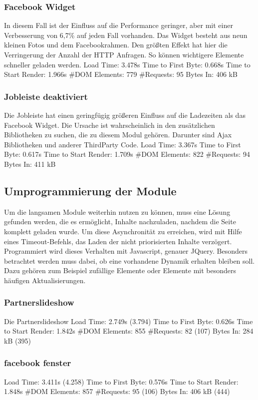 \subsubsection{Facebook Widget} In diesem Fall ist der Einfluss auf die Performance geringer, aber mit einer Verbesserung von 6,7\% auf jeden Fall vorhanden. Das Widget besteht aus neun kleinen Fotos und dem Facebookrahmen. Den größten Effekt hat hier die Verringerung der Anzahl der HTTP Anfragen. So können wichtigere Elemente schneller geladen werden.
Load Time: 3.478s
Time to First Byte: 0.668s %
Time to Start Render: 1.966s
\#DOM Elements: 779 	
\#Requests: 95 
Bytes In: 406 kB 

\subsubsection{Jobleiste deaktiviert} Die Jobleiste hat einen geringfügig größeren Einfluss auf die Ladezeiten als das Facebook Widget. Die Ursache ist wahrscheinlich in den zusätzlichen Bibliotheken zu suchen, die zu diesem Modul gehören. Darunter sind Ajax Bibliotheken und anderer ThirdParty Code. 
Load Time: 3.367s
Time to First Byte: 0.617s %
Time to Start Render: 1.709s
\#DOM Elements: 822 	
\#Requests: 94 
Bytes In: 411 kB

\subsection{Umprogrammierung der Module}
Um die langsamen Module weiterhin nutzen zu können, muss eine Lösung gefunden werden, die es ermöglicht, Inhalte nachzuladen, nachdem die Seite komplett geladen wurde. Um diese Asynchronität zu erreichen, wird mit Hilfe eines Timeout-Befehls, das Laden der nicht priorisierten Inhalte verzögert. Programmiert wird dieses Verhalten mit Javascript, genauer JQuery. Besonders betrachtet werden muss dabei, ob eine vorhandene Dynamik erhalten bleiben soll. Dazu gehören zum Beispiel zufällige Elemente oder Elemente mit besonders häufigen Aktualisierungen.

\subsubsection{Partnerslideshow} Die Partnerslideshow 
Load Time: 2.749s (3.794)
Time to First Byte: 0.626s %
Time to Start Render: 1.842s
\#DOM Elements: 855 	
\#Requests: 82 (107)
Bytes In: 284 kB (395)

\subsubsection{facebook fenster}
Load Time: 3.411s (4.258)
Time to First Byte: 0.576s %
Time to Start Render: 1.848s
\#DOM Elements: 857
\#Requests: 95 (106)
Bytes In: 406 kB (444)

